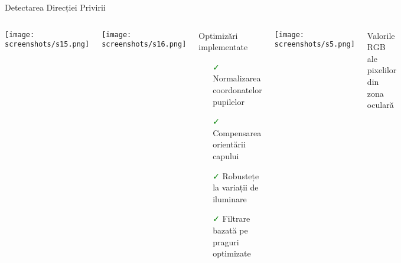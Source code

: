 \documentclass[aspectratio=169,9pt]{beamer}
\newenvironment{cardblock}[1]{%
    \begin{block}{#1}
}{%
    \end{block}
}
\begin{document}
\begin{frame}{Detectarea Direcției Privirii}
        \begin{columns}[T]
                        \vspace{-0.5cm}
                        \texttt{[image: screenshots/s15.png]}
                        
                        \vspace{0.05cm}
                        
                        \texttt{[image: screenshots/s16.png]}

                        
                        \vspace{-1.2cm}
                        \hspace{-2.5cm}
                        \begin{minipage}{1.05\textwidth}
                                \begin{cardblock}{Optimizări implementate}
                                        \small
                                        \begin{itemize}[leftmargin=0.5cm,itemsep=0.05cm]
                                                \item[\textcolor{green}{\faCheck}] Normalizarea coordonatelor pupilelor
                                                \item[\textcolor{green}{\faCheck}] Compensarea orientării capului
                                                \item[\textcolor{green}{\faCheck}] Robustețe la variații de iluminare
                                                \item[\textcolor{green}{\faCheck}] Filtrare bazată pe praguri optimizate
                                        \end{itemize}
                                \end{cardblock}
                                
                                \centering\texttt{[image: screenshots/s5.png]}
                                
                                \centering\footnotesize Valorile RGB ale pixelilor din zona oculară
                                

\end{minipage}
\end{columns}
\end{frame}
\end{document}

